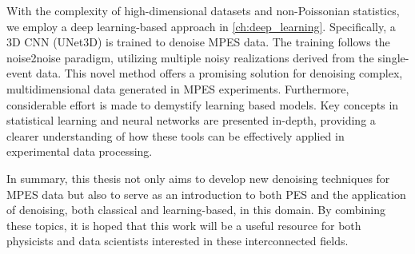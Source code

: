 With the complexity of high-dimensional datasets and non-Poissonian statistics, we employ a deep learning-based approach in \cref{ch:deep_learning}. Specifically, a 3D \gls{CNN} (UNet3D) is trained to denoise \gls{MPES} data. The training follows the \gls{noise2noise} paradigm, utilizing multiple noisy realizations derived from the single-event data. This novel method offers a promising solution for denoising complex, multidimensional data generated in \gls{MPES} experiments. Furthermore, considerable effort is made to demystify learning based models. Key concepts in statistical learning and neural networks are presented in-depth, providing a clearer understanding of how these tools can be effectively applied in experimental data processing.

In summary, this thesis not only aims to develop new denoising techniques for \gls{MPES} data but also to serve as an introduction to both \gls{PES} and the application of denoising, both classical and learning-based, in this domain. By combining these topics, it is hoped that this work will be a useful resource for both physicists and data scientists interested in these interconnected fields.